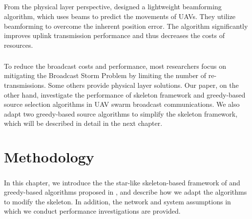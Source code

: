 \documentclass[a4paper,12pt]{report}
\begin{document}
\paragraph{}
From the physical layer perspective, \cite{beamforming} designed a lightweight beamforming algorithm, which uses beams to predict the movements of UAVs. They utilize beamforming to overcome the inherent position error. The algorithm significantly improves uplink transmission performance and thus decreases the costs of resources.

\paragraph{}
To reduce the broadcast costs and performance, most researchers focus on mitigating the Broadcast Storm Problem by limiting the number of re-transmissions. Some others provide physical layer solutions. Our paper, on the other hand, investigate the performance of skeleton framework and greedy-based source selection algorithms in UAV swarm broadcast communications. We also adapt two greedy-based source algorithms to simplify the skeleton framework, which will be described in detail in the next chapter.


\chapter {Methodology}

\paragraph{}
In this chapter, we introduce the the star-like skeleton-based framework of \cite{ssr} and greedy-based algorithms proposed in \cite{prose}, and describe how we adapt the algorithms to modify the skeleton. In addition, the network and system assumptions in which we conduct performance investigations are provided.
\end{document}
